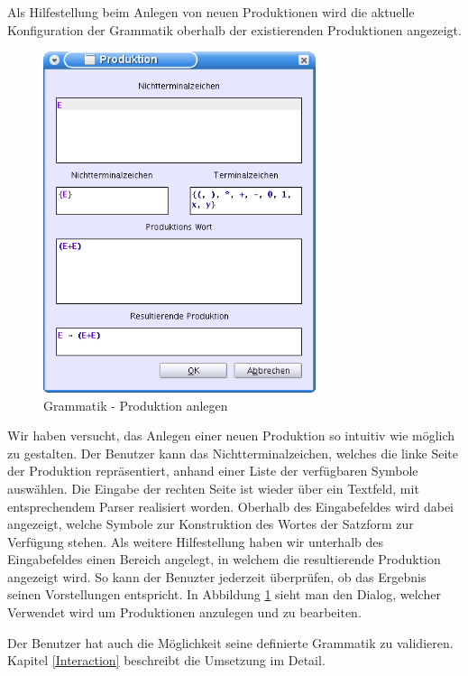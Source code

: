 Als Hilfestellung beim Anlegen von neuen Produktionen wird die aktuelle
Konfiguration der Grammatik oberhalb der existierenden Produktionen
angezeigt.\vspace{10pt}


\begin{figure}[h!]
\begin{center}
\includegraphics[width=8cm]{../images/production_dialog.png}
\caption{Grammatik - Produktion anlegen}
\label{FigureAddProduction}
\end{center}
\end{figure}
\vspace{10pt}

Wir haben versucht, das Anlegen einer neuen Produktion so intuitiv wie möglich
zu gestalten. Der Benutzer kann das Nichtterminalzeichen, welches die linke
Seite der Produktion repräsentiert, anhand einer Liste der
verfügbaren Symbole auswählen. Die Eingabe der rechten Seite ist
wieder über ein Textfeld, mit entsprechendem Parser realisiert
worden. Oberhalb des Eingabefeldes wird dabei angezeigt, welche Symbole zur
Konstruktion des Wortes der Satzform zur Verfügung stehen. Als weitere
Hilfestellung haben wir unterhalb des Eingabefeldes einen Bereich angelegt,
in welchem die resultierende Produktion angezeigt wird. So kann der
Benuzter jederzeit überprüfen, ob das Ergebnis seinen
Vorstellungen entspricht. In Abbildung \ref{FigureAddProduction}
sieht man den Dialog, welcher Verwendet wird um Produktionen
anzulegen und zu bearbeiten.\vspace{10pt}

Der Benutzer hat auch die Möglichkeit seine definierte Grammatik zu validieren.
Kapitel \ref{Interaction} beschreibt die Umsetzung im Detail.\vspace{10pt}
